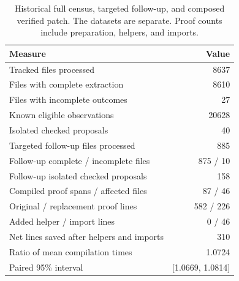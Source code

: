 \begin{table}[!htbp]\centering\small
\caption{Historical full census, targeted follow-up, and composed verified patch. The datasets are separate. Proof counts include preparation, helpers, and imports.}
\begin{tabular}{lr}\toprule
Measure & Value\\\midrule
Tracked files processed & 8637\\
Files with complete extraction & 8610\\
Files with incomplete outcomes & 27\\
Known eligible observations & 20628\\
Isolated checked proposals & 40\\
Targeted follow-up files processed & 885\\
Follow-up complete / incomplete files & 875 / 10\\
Follow-up isolated checked proposals & 158\\
Compiled proof spans / affected files & 87 / 46\\
Original / replacement proof lines & 582 / 226\\
Added helper / import lines & 0 / 46\\
Net lines saved after helpers and imports & 310\\
Ratio of mean compilation times & 1.0724\\
Paired 95\% interval & [1.0669, 1.0814]\\
\bottomrule\end{tabular}\end{table}
